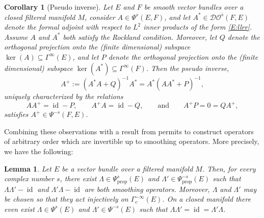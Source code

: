 \documentclass[reqno,12pt]{amsart}
\DeclareMathOperator{\id}{id}
\newcommand{\DO}{\mathcal D\mathcal O}
\newcommand\prop{\textrm{prop}}
\theoremstyle{plain}
\newtheorem{corollary}[theorem]{Corollary}
\newtheorem{lemma}[theorem]{Lemma}
\theoremstyle{definition}
\begin{document}
\begin{corollary}[Pseudo inverse]\label{C:pseudoinverse}
Let $E$ and $F$ be smooth vector bundles over a closed filtered manifold $M$, consider $A\in\Psi^s(E,F)$, and let $A^*\in\DO^{\bar s}(F,E)$ denote the formal adjoint with respect to $L^2$ inner products of the form \eqref{E:llrr}.
Assume $A$ and $A^*$ both satisfy the Rockland condition.
Moreover, let $Q$ denote the orthogonal projection onto the (finite dimensional) subspace $\ker(A)\subseteq\Gamma^\infty(E)$, and let $P$ denote the orthogonal projection onto the (finite dimensional) subspace $\ker(A^*)\subseteq\Gamma^\infty(F)$.
Then the pseudo inverse, 
$$
A^+:=(A^*A+Q)^{-1}A^*=A^*(AA^*+P)^{-1},
$$ 
uniquely characterized by the relations 
$$
AA^+=\id-P,\qquad A^+A=\id-Q,\qquad\text{and}\qquad A^+P=0=QA^+,
$$ 
satisfies $A^+\in\Psi^{-s}(F,E)$.
\end{corollary}


Combining these observations with a result from \cite{CGGP92} permits to construct operators of arbitrary order which are invertible up to smoothing operators.
More precisely, we have the following:


\begin{lemma}\label{L:Lambda}
Let $E$ be a vector bundle over a filtered manifold $M$.
Then, for every complex number $s$, there exist $\Lambda\in\Psi^s_\prop(E)$ and $\Lambda'\in\Psi^{-s}_\prop(E)$ 
such that $\Lambda\Lambda'-\id$ and $\Lambda'\Lambda-\id$ are both smoothing operators.
Moreover, $\Lambda$ and $\Lambda'$ may be chosen so that they act injectively on $\Gamma^{-\infty}_c(E)$.
On a closed manifold there even exist $\Lambda\in\Psi^s(E)$ and $\Lambda'\in\Psi^{-s}(E)$ such that $\Lambda\Lambda'=\id=\Lambda'\Lambda$.
\end{lemma}
\end{document}
